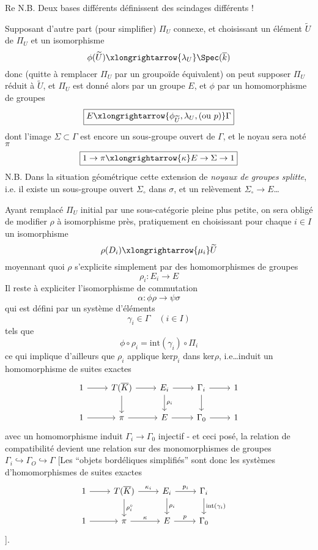 Re N.B. Deux bases différents définissent des scindages différents !

Supposant d'autre part (pour simplifier) $\Pi_U$ connexe, et choisissant un élément $\widetilde{U}$ de $\Pi_U$ et un isomorphisme
$$
\phi(\widetilde{U}) \xlongrightarrow{\lambda_U} \Spec(\overline{k})
$$
donc (quitte à remplacer $\Pi_U$ par un groupoïde équivalent) on peut supposer $\Pi_U$ réduit à $\widetilde{U}$, et $\Pi_U$ est donné alors par un groupe $E$, et $\phi$ par un homomorphisme de groupes
$$
\boxed{E \xlongrightarrow{\phi_{\widetilde{U}}, \lambda_U, \text{(ou}~p)} \Gamma}
$$
dont l'image $\Sigma \subset  \Gamma$ est encore un sous-groupe ouvert de $\Gamma$, et le noyau sera noté $\pi$
$$
\boxed{1 \to \pi \xlongrightarrow{\kappa} E \to \Sigma \to 1}
$$
N.B. Dans la situation géométrique cette extension de \emph{noyaux de groupes splitte}, i.e. il existe un sous-groupe ouvert $\Sigma_{\circ}$ dans $\sigma$, et un relèvement $\Sigma_{\circ} \to E$\dots

Ayant remplacé $\Pi_U$ initial par une sous-catégorie pleine plus petite, on sera obligé de modifier $\rho$ à isomorphisme près, pratiquement en choisissant pour chaque $i \in I$ un isomorphisme
$$
\rho(D_i) \xlongrightarrow{\mu_i} \widetilde{U}
$$
moyennant quoi $\rho$ s'explicite simplement par des homomorphismes de groupes
$$
\boxed{\rho_i: E_i \to E}
$$
Il reste à expliciter l'isomorphisme de commutation
$$
\alpha: \phi\rho \to \psi\sigma
$$
qui est défini par un système d'éléments
$$
\boxed{\gamma_i \in \Gamma \quad (i \in I)}
$$
tels que
$$
\phi \circ \rho_i = \text{int}(\gamma_i) \circ \Pi_i
$$
ce qui implique d'ailleurs que $\rho_i$ applique ker$p_i$ dans ker$\rho$, i.e\dots induit un homomorphisme de suites exactes
\[\begin{tikzcd}
	1 & {T(\overline{K})} & {E_i} & {\Gamma_i} & 1 \\
	1 & \pi & E & {\Gamma_0} & 1
	\arrow[from=1-4, to=1-5]
	\arrow[from=2-4, to=2-5]
	\arrow[from=1-4, to=2-4]
	\arrow["{\rho_i}", from=1-3, to=2-3]
	\arrow[from=1-3, to=1-4]
	\arrow[from=2-3, to=2-4]
	\arrow[from=2-2, to=2-3]
	\arrow[from=1-2, to=1-3]
	\arrow[from=1-2, to=2-2]
	\arrow[from=2-1, to=2-2]
	\arrow[from=1-1, to=1-2]
\end{tikzcd}\]
avec un homomorphisme induit $\Gamma_i \to \Gamma_0$ injectif - et ceci posé, la relation de compatibilité devient une relation sur des monomorphismes de groupes $\Gamma_i \hookrightarrow \Gamma_O \hookrightarrow \Gamma$ [Les ``objets bordéliques simplifiés'' sont donc les systèmes d'homomorphismes de suites exactes $$\begin{tikzcd}
1 & {T(\overline{K})} & {E_i} & {\Gamma_i} & {} \\
	1 & \pi & E & {\Gamma_0}
	\arrow["{\text{int}(\gamma_i)}", from=1-4, to=2-4]
	\arrow["{\rho_i}", from=1-3, to=2-3]
	\arrow["{p_i}", from=1-3, to=1-4]
	\arrow["p", from=2-3, to=2-4]
	\arrow["\kappa", from=2-2, to=2-3]
	\arrow["{\kappa_i}", from=1-2, to=1-3]
	\arrow["{\rho_i^\circ}", from=1-2, to=2-2]
	\arrow[from=2-1, to=2-2]
\arrow[from=1-1, to=1-2]
\end{tikzcd}$$].


